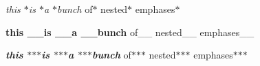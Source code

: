 {\itshape this $\ast$is $\ast$a $\ast$bunch} of$\ast$ nested$\ast$ emphases$\ast$

{\bfseries{this \+\_\+\+\_\+is \+\_\+\+\_\+a \+\_\+\+\_\+bunch}} of\+\_\+\+\_\+ nested\+\_\+\+\_\+ emphases\+\_\+\+\_\+

{\itshape {\bfseries{this $\ast$$\ast$$\ast$is $\ast$$\ast$$\ast$a $\ast$$\ast$$\ast$bunch}}} of$\ast$$\ast$$\ast$ nested$\ast$$\ast$$\ast$ emphases$\ast$$\ast$$\ast$ 